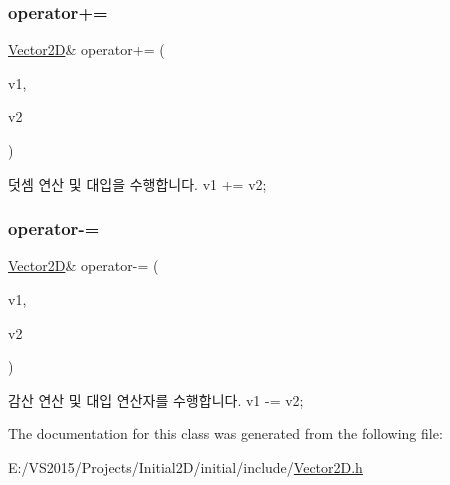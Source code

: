 \subsubsection{\texorpdfstring{operator+=}{operator+=}}
{\footnotesize\ttfamily \mbox{\hyperlink{class_vector2_d}{Vector2D}}\& operator+= (\begin{DoxyParamCaption}\item[{\mbox{\hyperlink{class_vector2_d}{Vector2D}} \&}]{v1,  }\item[{const \mbox{\hyperlink{class_vector2_d}{Vector2D}} \&}]{v2 }\end{DoxyParamCaption})\hspace{0.3cm}{\ttfamily [friend]}}

덧셈 연산 및 대입을 수행합니다. v1 += v2; \mbox{\label{class_vector2_d_a9c4fa3260112a6179df34041de9a8ab2}} 
\subsubsection{\texorpdfstring{operator-\/=}{operator-=}}
{\footnotesize\ttfamily \mbox{\hyperlink{class_vector2_d}{Vector2D}}\& operator-\/= (\begin{DoxyParamCaption}\item[{\mbox{\hyperlink{class_vector2_d}{Vector2D}} \&}]{v1,  }\item[{const \mbox{\hyperlink{class_vector2_d}{Vector2D}} \&}]{v2 }\end{DoxyParamCaption})\hspace{0.3cm}{\ttfamily [friend]}}

감산 연산 및 대입 연산자를 수행합니다. v1 -\/= v2; 

The documentation for this class was generated from the following file\+:\begin{DoxyCompactItemize}
\item 
E\+:/\+V\+S2015/\+Projects/\+Initial2\+D/initial/include/\mbox{\hyperlink{_vector2_d_8h}{Vector2\+D.\+h}}\end{DoxyCompactItemize}
